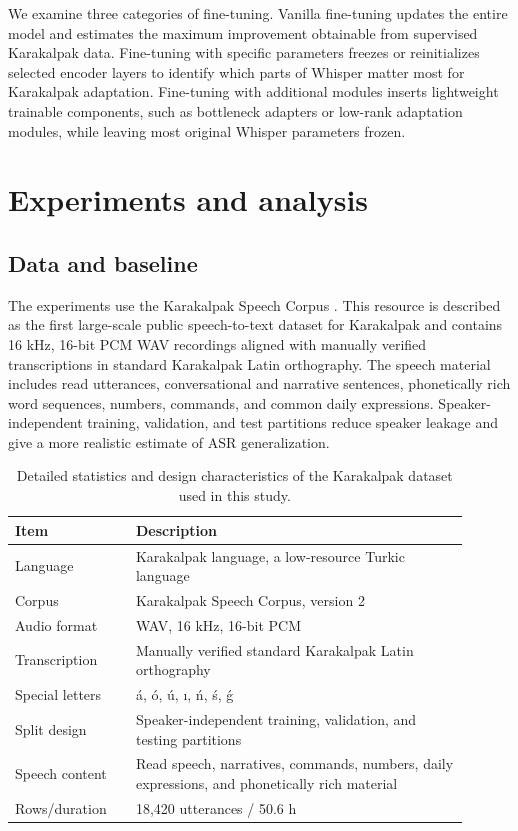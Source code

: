 \documentclass[11pt]{article}
\begin{document}
We examine three categories of fine-tuning. Vanilla fine-tuning updates the entire model and estimates the maximum improvement obtainable from supervised Karakalpak data. Fine-tuning with specific parameters freezes or reinitializes selected encoder layers to identify which parts of Whisper matter most for Karakalpak adaptation. Fine-tuning with additional modules inserts lightweight trainable components, such as bottleneck adapters or low-rank adaptation modules, while leaving most original Whisper parameters frozen.

\section{Experiments and analysis}

\subsection{Data and baseline}

The experiments use the Karakalpak Speech Corpus \cite{uteuliev2026karakalpak}. This resource is described as the first large-scale public speech-to-text dataset for Karakalpak and contains 16 kHz, 16-bit PCM WAV recordings aligned with manually verified transcriptions in standard Karakalpak Latin orthography. The speech material includes read utterances, conversational and narrative sentences, phonetically rich word sequences, numbers, commands, and common daily expressions. Speaker-independent training, validation, and test partitions reduce speaker leakage and give a more realistic estimate of ASR generalization.

\begin{table}[H]
\centering
\caption{Detailed statistics and design characteristics of the Karakalpak dataset used in this study.}
\label{tab:data}
\begin{tabular}{p{0.24\linewidth}p{0.66\linewidth}}
\toprule
Item & Description \\
\midrule
Language & Karakalpak language, a low-resource Turkic language \\
Corpus & Karakalpak Speech Corpus, version 2 \cite{uteuliev2026karakalpak} \\
Audio format & WAV, 16 kHz, 16-bit PCM \\
Transcription & Manually verified standard Karakalpak Latin orthography \\
Special letters & á, ó, ú, ı, ń, ś, ǵ \\
Split design & Speaker-independent training, validation, and testing partitions \\
Speech content & Read speech, narratives, commands, numbers, daily expressions, and phonetically rich material \\
Rows/duration & 18,420 utterances / 50.6 h \\
\bottomrule
\end{tabular}
\end{table}
\end{document}

